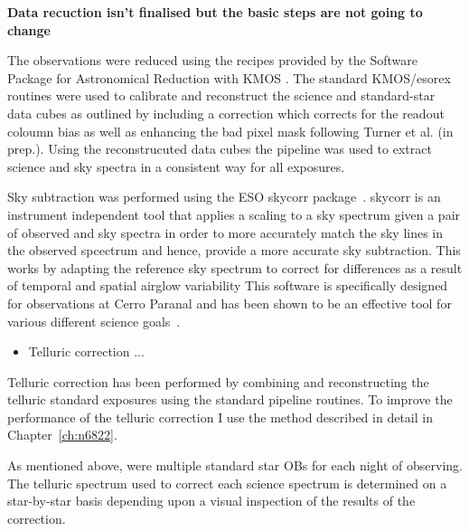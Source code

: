 \textbf{Data recuction isn't finalised but the basic steps are not going to change}

The observations were reduced using the recipes provided by the Software Package for Astronomical Reduction with KMOS
\citep[SPARK;][]{2013A&A...558A..56D}.
The standard KMOS/esorex routines were used to calibrate and reconstruct the science and standard-star data cubes as outlined by
\cite{2013A&A...558A..56D} including a correction which corrects for the readout coloumn bias as well as enhancing the bad pixel mask following Turner et al. (in prep.).
Using the reconstrucuted data cubes the pipeline was used to extract science and sky spectra in a consistent way for all exposures.

Sky subtraction was performed using the ESO {\sc skycorr} package~\citep{2014A&A...567A..25N}.
{\sc skycorr} is an instrument independent tool that applies a scaling to a sky spectrum given a pair of observed and sky spectra in order to more accurately match the sky lines in the observed spcectrum and hence, provide a more accurate sky subtraction.
This works by adapting the reference sky spectrum to correct for differences as a result of temporal and spatial airglow variability
This software is specifically designed for observations at Cerro Paranal and has been shown to be an effective tool for various different science goals~\citep[e.g.][]{2014A&A...567A..25N,2015ApJ...805..182G,2016MNRAS.455.2028F,2016MNRAS.457.1468L}.



\begin{itemize}
    \item Telluric correction ...
\end{itemize}


Telluric correction has been performed by combining and reconstructing the telluric standard exposures using the standard pipeline routines.
To improve the performance of the telluric correction I use the method described in detail in Chapter~\ref{ch:n6822}.

As mentioned above, were multiple standard star OBs for each night of observing.
The telluric spectrum used to correct each science spectrum is determined on a star-by-star basis depending upon a visual inspection of the results of the correction.


